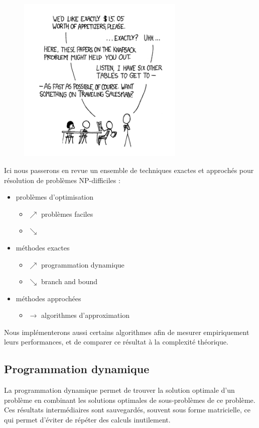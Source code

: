 \begin{figure}[h!]
\centering
\includegraphics[height = 8cm]{../images/np_complete.png}
\end{figure}

Ici nous passerons en revue un ensemble de techniques exactes et approchés pour 
résolution de problèmes NP-difficiles :

\begin{itemize}
  \item problèmes d'optimisation 
  \begin{itemize}
    \item[] $\nearrow$ problèmes faciles
    \item[] $\searrow$ 
  \end{itemize}
	\item méthodes exactes 
	\begin{itemize}
		\item[] $\nearrow$ programmation dynamique
		\item[] $\searrow$ branch and bound
	\end{itemize}
	\item méthodes approchées
	\begin{itemize}
		\item[] $\longrightarrow$ algorithmes d'approximation
	\end{itemize}
\end{itemize}

Nous implémenterons aussi certains algorithmes afin de mesurer empiriquement leurs performances, et de comparer ce résultat à la complexité théorique.

\subsection{Programmation dynamique}
La programmation dynamique permet de trouver la solution optimale d'un
problème en combinant les solutions optimales de sous-problèmes de ce
problème. Ces résultats intermédiaires sont sauvegardés, souvent sous
forme matricielle, ce qui permet d'éviter de répéter des calculs inutilement.


